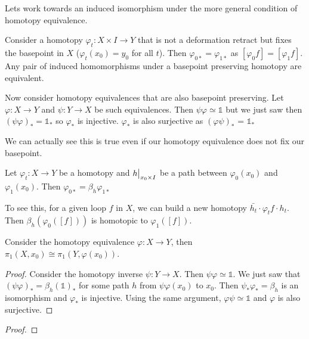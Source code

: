 \documentclass[10pt]{article}
\newcommand\restr[2]{{%
  \left.\kern-\nulldelimiterspace %
  #1 %
  \vphantom{\big|} %
  \right|_{#2} %
}}
\begin{document}
Lets work towards an induced isomorphism under the more general condition of
homotopy equivalence.

Consider a homotopy $\varphi_t: X \times I \to Y$ that is not a deformation retract but fixes the basepoint in $X$ ($\varphi_t(x_0) = y_0$ for all $t$). Then $\varphi_{0*} = \varphi_{1*}$ as $[\varphi_0f] = [\varphi_1f]$. Any pair of induced homomorphisms under a basepoint preserving homotopy are equivalent.

Now consider homotopy equivalences that are also basepoint preserving. Let $\varphi: X \to Y$ and $\psi: Y \to X$ be such equivalences. Then $\psi\varphi \simeq \mathds{1}$ but we just saw then $(\psi\varphi)_* = \mathds{1}_*$ so $\varphi_*$ is injective. $\varphi_*$ is also surjective as $(\varphi\psi)_*$ = $\mathds{1}_*$

	We can actually see this is true even if our homotopy equivalence does not fix our basepoint.

\begin{lemma}[]
	Let $\varphi_t: X \to Y$ be a homotopy and $\restr{h}{x_0 \times I}$ be a path between $\varphi_0(x_0)$ and $\varphi_1(x_0)$. Then $\varphi_{0*} = \beta_h \varphi_{1*}$
\end{lemma}

\begin{note}
	To see this, for a given loop $f$ in $X$, we can build a new homotopy $\bar{h_t} \cdot \varphi_tf \cdot h_t$. Then $\beta_h(\varphi_0([f]))$ is homotopic to $\varphi_1([f])$.
\end{note}

\begin{theorem}
Consider the homotopy equivalence $\varphi: X \to Y$, then $\pi_1(X, x_0) \cong \pi_1(Y, \varphi(x_0))$.
\end{theorem}

\begin{proof}
	Consider the homotopy inverse $\psi: Y \to X$. Then $\psi\varphi \simeq \mathds{1}$. We just saw that $(\psi\varphi)_* = \beta_h(\mathds{1})_*$ for some path $h$ from $\psi\varphi(x_0)$ to $x_0$. Then $\psi_*\varphi_* = \beta_h$ is an isomorphism and $\varphi_*$ is injective.
	Using the same argument, $\varphi\psi \simeq \mathds{1}$ and $\varphi$ is also surjective.
\end{proof}

\begin{exercise}[]

\end{exercise}
\begin{proof}
\end{proof}
\end{document}
